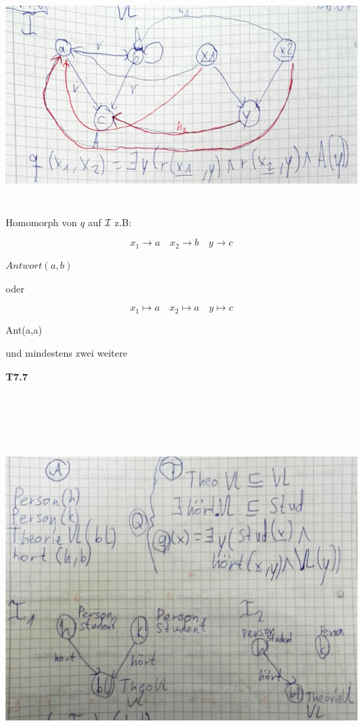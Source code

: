 \includegraphics[width=5.81910in,height=3.23200in]{media/76intelog.png}

Homomorph von $q$ auf $\mathcal{I}$ z.B:

$$x_1 \rightarrow a \quad x_2 \rightarrow b \quad y \rightarrow c$$

$Antwort(a,b)$

oder 

$$x_1 \mapsto a \quad x_2 \mapsto a \quad y \mapsto c$$

Ant(a,a)

und mindestens zwei weitere

\textbf{T7.7}

\includegraphics[width=5.81910in,height=5.83200in]{media/77omq.png}

